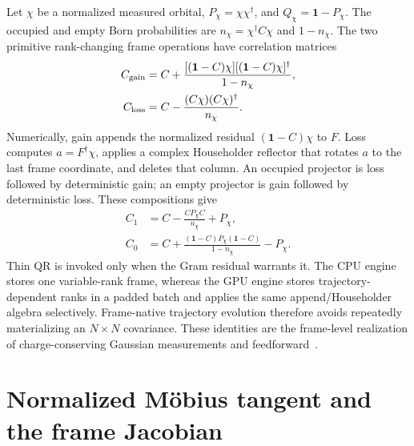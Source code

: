 \documentclass[aps,prx,twocolumn,superscriptaddress,longbibliography,nofootinbib,floatfix]{revtex4-2}
\newcommand{\Id}{\mathbf{1}}
\begin{document}
Let $\chi$ be a normalized measured orbital, $P_\chi=\chi\chi^\dagger$, and
$Q_\chi=\Id-P_\chi$.  The occupied and empty Born probabilities are
$n_\chi=\chi^\dagger C\chi$ and $1-n_\chi$.  The two primitive rank-changing
frame operations have correlation matrices
\begin{align}
 C_{\rm gain}
 &=C+\frac{[(\Id-C)\chi][(\Id-C)\chi]^\dagger}{1-n_\chi},
 \label{eq:gain}\\
 C_{\rm loss}
 &=C-\frac{(C\chi)(C\chi)^\dagger}{n_\chi}.
 \label{eq:loss}
\end{align}
Numerically, gain appends the normalized residual $(\Id-C)\chi$ to $F$.
Loss computes $a=F^\dagger\chi$, applies a complex Householder reflector that
rotates $a$ to the last frame coordinate, and deletes that column.  An occupied
projector is loss followed by deterministic gain; an empty projector is gain
followed by deterministic loss.  These compositions give
\begin{align}
 C_{1}&=C-\frac{CP_\chi C}{n_\chi}+P_\chi,\nonumber\\
 C_{0}&=C+\frac{(\Id-C)P_\chi(\Id-C)}{1-n_\chi}-P_\chi.
 \label{eq:pure-projectors}
\end{align}
Thin QR is invoked only when the Gram residual warrants it.  The CPU engine stores one
variable-rank frame, whereas the GPU engine stores trajectory-dependent ranks in a padded
batch and applies the same append/Householder algebra selectively.  Frame-native trajectory
evolution therefore avoids repeatedly materializing an $N\times N$ covariance.  These
identities are the frame-level realization of charge-conserving Gaussian measurements
and feedforward~\cite{Bravyi2005,BhuiyanPanJian2026}.

\section{Normalized M\"obius tangent and the frame Jacobian}
\end{document}
